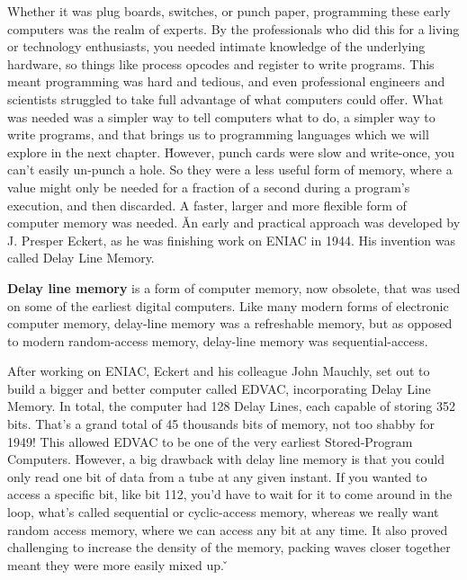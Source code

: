 Whether it was plug boards, switches, or punch paper, programming these early computers was the realm of experts. By
the professionals who did this for a living or technology enthusiasts, you needed intimate knowledge of the
underlying hardware, so things like process opcodes and register to write programs. This meant programming was hard
and tedious, and even professional engineers and scientists struggled to take full advantage of what computers could
offer. What was needed was a simpler way to tell computers what to do, a simpler way to write programs, and that
brings us to programming languages which we will explore in the next chapter. \v

However, punch cards were slow and write-once, you can't easily un-punch a hole. So they were a less useful form of
memory, where a value might only be needed for a fraction of a second during a program's execution, and then
discarded. A faster, larger and more flexible form of computer memory was needed. \v

An early and practical approach was developed by J. Presper Eckert, as he was finishing work on ENIAC in 1944. His
invention was called Delay Line Memory.

\textbf{Delay line memory} is a form of computer memory, now obsolete, that was used on some of the earliest digital
computers. Like many modern forms of electronic computer memory, delay-line memory was a refreshable memory, but as
opposed to modern random-access memory, delay-line memory was sequential-access.
\ed


After working on ENIAC, Eckert and his colleague John Mauchly, set out to build a bigger and better computer called
EDVAC, incorporating Delay Line Memory. In total, the computer had 128 Delay Lines, each capable of storing 352 bits.
That's a grand total of 45 thousands bits of memory, not too shabby for 1949! This allowed EDVAC to be one of the
very earliest Stored-Program Computers. \v

However, a big drawback with delay line memory is that you could only read one bit of data from a tube at any given
instant. If you wanted to access a specific bit, like bit 112, you'd have to wait for it to come around in the loop,
what's called sequential or cyclic-access memory, whereas we really want random access memory, where we can access
any bit at any time. It also proved challenging to increase the density of the memory, packing waves closer together
meant they were more easily mixed up. \v

